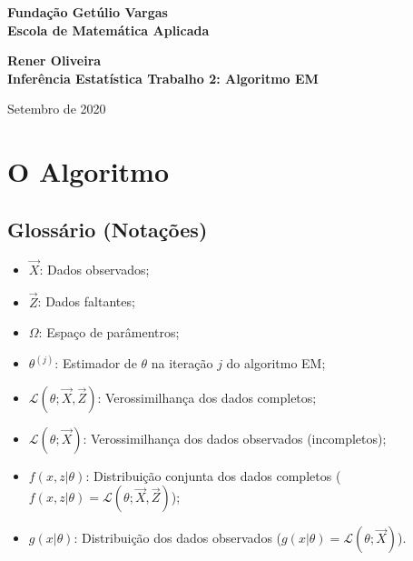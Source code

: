 \documentclass[12pt]{article}
\newcommand{\lik}{\mathcal{L}}
\begin{document}
\begin{titlepage}
\begin{center}
\textbf{\LARGE Fundação Getúlio Vargas}\\ 
\textbf{\LARGE Escola de Matemática Aplicada}

\par
\vspace{160pt}
\textbf{\Large Rener Oliveira}\\
\vspace{160pt}
\textbf{\Large Inferência Estatística Trabalho 2: Algoritmo EM}\\

\end{center}
\vspace{32pt}
\par
\vfill
\vspace{32pt}
\begin{center}
{\normalsize Setembro de 2020}
\end{center}
\end{titlepage}

\newpage
\tableofcontents





\newpage


\section{O Algoritmo}

\subsection{Glossário (Notações)}
\begin{itemize}
    \item $\vec{X}$: Dados observados;
    \item $\vec{Z}$: Dados faltantes;
    \item $\Omega$: Espaço de parâmentros;
    \item $\theta^{(j)}$: Estimador de $\theta$ na iteração $j$ do algoritmo EM;
    \item $\lik(\theta;\vec X,\vec Z)$: Verossimilhança dos dados completos;
    \item $\lik(\theta;\vec X)$: Verossimilhança dos dados observados (incompletos);
    \item $f(x,z|\theta)$: Distribuição conjunta dos dados completos ($f(x,z|\theta)=\lik(\theta;\vec X,\vec Z)$);
    \item $g(x|\theta)$: Distribuição dos dados observados ($g(x|\theta)=\lik(\theta;\vec X)$).
\end{itemize}
 
\end{document}
